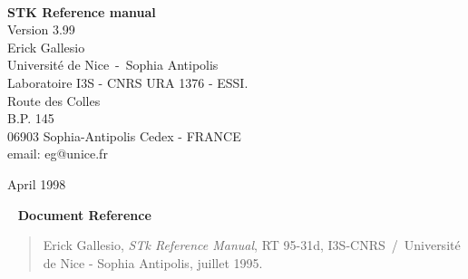 \documentclass[11pt,a4paper]{book}
\begin{document}
\parindent 0pt                          %


%
% 
\renewcommand{\thechapter}{}                    %
\renewcommand{\thesection}{\arabic{section}}    %

%
%
\newcommand{\stkversion}{3.99}
\newcommand{\stk}{{\sc STk}}
\newcommand{\stklos}{{\sc STklos}}
\newcommand{\doc}{{\em Identical to R$^{4}$RS.}}
\newcommand{\rrrr}{{\em R$^{4}\!RS$}}
\newcommand{\rthree}{{\em R$^{3}\!RS$}}
\newcommand{\rfour}{{\em R$^{4}\!RS$}}
\newcommand{\rfive}{{\em R$^{5}\!RS$}}
\newcommand{\saut}{\vskip2mm}
\newcommand{\tilda}{{\tt\char126}}
\newcommand{\etoile}{{\tt\char42}}
\newcommand{\leftbracket}{{\tt\char91}}
\newcommand{\rightbracket}{{\tt\char93}}
\newcommand{\hyperiii}[1]{\hyper{#1$_3$}}
\newcommand{\clearemptydoublepage}{\newpage{\thispagestyle{empty}\cleardoublepage}}

%
%
\thispagestyle{empty}
\begin{center}   
\ \\[3cm]
{\huge\bf ST{\large\bf{K}} Reference manual}\\[3mm]
{\Large Version \stkversion}\\[3cm]
{\large Erick Gallesio \\
Universit\'e de Nice~-~Sophia Antipolis \\
Laboratoire I3S - CNRS URA 1376 - ESSI. \\
Route des Colles\\
B.P. 145\\
06903 Sophia-Antipolis Cedex - FRANCE\\[3mm]
email: eg@unice.fr}
\end{center}
\vskip8cm
\begin{flushright}
April 1998
\end{flushright}
\newpage
\thispagestyle{empty}
{\ }
\vskip2cm
{\bf Document Reference}
\begin{quote}
Erick Gallesio, {\em STk Reference Manual}, RT 95-31d,
I3S-CNRS~/~Universit\'e de Nice - Sophia Antipolis, juillet 1995.
\end{quote}
\end{document}
